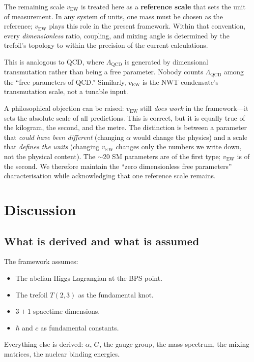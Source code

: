 \documentclass[11pt]{article}
\begin{document}
The remaining scale $v_\text{EW}$ is treated here as a
\textbf{reference scale} that sets the unit of measurement.  In
any system of units, one mass must be chosen as the reference;
$v_\text{EW}$ plays this role in the present framework.  Within
that convention, every \emph{dimensionless} ratio, coupling, and
mixing angle is determined by the trefoil's topology to within
the precision of the current calculations.

This is analogous to QCD, where $\Lambda_\text{QCD}$ is
generated by dimensional transmutation rather than being a free
parameter.  Nobody counts $\Lambda_\text{QCD}$ among the ``free
parameters of QCD.''  Similarly, $v_\text{EW}$ is the NWT
condensate's transmutation scale, not a tunable input.

A philosophical objection can be raised: $v_\text{EW}$ still
\emph{does work} in the framework---it sets the absolute scale
of all predictions.  This is correct, but it is equally true
of the kilogram, the second, and the metre.  The distinction is
between a parameter that \emph{could have been different}
(changing $\alpha$ would change the physics) and a scale that
\emph{defines the units} (changing $v_\text{EW}$ changes only
the numbers we write down, not the physical content).  The
$\sim 20$ SM parameters are of the first type; $v_\text{EW}$ is
of the second.  We therefore maintain the ``zero dimensionless
free parameters'' characterisation while acknowledging that one
reference scale remains.


\section{Discussion}
\label{sec:discussion}

\subsection{What is derived and what is assumed}

The framework assumes:
\begin{itemize}\setlength\itemsep{0pt}
  \item The abelian Higgs Lagrangian at the BPS point.
  \item The trefoil $T(2,3)$ as the fundamental knot.
  \item $3+1$ spacetime dimensions.
  \item $\hbar$ and $c$ as fundamental constants.
\end{itemize}
Everything else is derived:
$\alpha$, $G$, the gauge group, the mass spectrum, the mixing
matrices, the nuclear binding energies.
\end{document}
